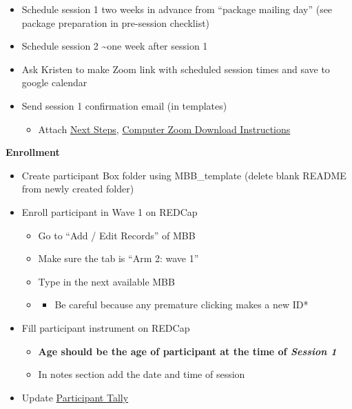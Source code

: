 \documentclass[]{book}
\providecommand{\tightlist}{%
  \setlength{\itemsep}{0pt}\setlength{\parskip}{0pt}}
\begin{document}
\begin{itemize}
\tightlist
\item
  Schedule session 1 two weeks in advance from ``package mailing day'' (see package preparation in pre-session checklist)
\item
  Schedule session 2 \textasciitilde{}one week after session 1
\item
  Ask Kristen to make Zoom link with scheduled session times and save to google calendar
\item
  Send session 1 confirmation email (in templates)

  \begin{itemize}
  \tightlist
  \item
    Attach \href{https://ucla.app.box.com/file/665452959932}{Next Steps}, \href{https://ucla.app.box.com/file/680632734387}{Computer Zoom Download Instructions}
  \end{itemize}
\end{itemize}

\textbf{Enrollment}

\begin{itemize}
\tightlist
\item
  Create participant Box folder using MBB\_template (delete blank README from newly created folder)
\item
  Enroll participant in Wave 1 on REDCap

  \begin{itemize}
  \item
    Go to ``Add / Edit Records'' of MBB
  \item
    Make sure the tab is ``Arm 2: wave 1''
  \item
    Type in the next available MBB
  \item
    \begin{itemize}
    \tightlist
    \item
      Be careful because any premature clicking makes a new ID*
    \end{itemize}
  \end{itemize}
\item
  Fill participant instrument on REDCap

  \begin{itemize}
  \tightlist
  \item
    \textbf{Age should be the age of participant at the time of \emph{Session 1} }
  \item
    In notes section add the date and time of session
  \end{itemize}
\item
  Update \href{https://ucla.app.box.com/file/724688028024}{Participant Tally}
\end{itemize}
\end{document}
